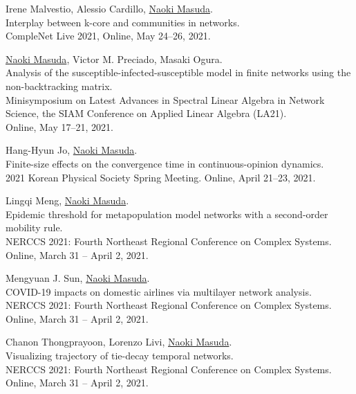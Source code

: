 \documentclass[11pt,letter]{article}
\begin{document}
\begin{etaremune}
\item Irene Malvestio, Alessio Cardillo, \underline{Naoki Masuda}.\\
Interplay between k-core and communities in networks.\\
CompleNet Live 2021, Online, May 24--26, 2021.\\

\item \underline{Naoki Masuda}, Victor M. Preciado, Masaki Ogura.\\
Analysis of the susceptible-infected-susceptible model in finite networks using the non-backtracking matrix.\\
Minisymposium on Latest Advances in Spectral Linear Algebra in Network Science, the SIAM Conference on Applied Linear Algebra (LA21).\\
Online, May 17--21, 2021.

\item Hang-Hyun Jo, \underline{Naoki Masuda}.\\
Finite-size effects on the convergence time in continuous-opinion dynamics.\\
2021 Korean Physical Society Spring Meeting.
Online, April 21--23, 2021.

\item Lingqi Meng, \underline{Naoki Masuda}.\\
Epidemic threshold for metapopulation model networks with a second-order mobility rule.\\
NERCCS 2021: Fourth Northeast Regional Conference on Complex Systems.\\
Online, March 31 -- April 2, 2021.

\item Mengyuan J. Sun, \underline{Naoki Masuda}.\\
COVID-19 impacts on domestic airlines via multilayer network analysis.\\
NERCCS 2021: Fourth Northeast Regional Conference on Complex Systems.\\
Online, March 31 -- April 2, 2021.

\item Chanon Thongprayoon, Lorenzo Livi, \underline{Naoki Masuda}.\\
Visualizing trajectory of tie-decay temporal networks.\\
NERCCS 2021: Fourth Northeast Regional Conference on Complex Systems.\\
Online, March 31 -- April 2, 2021.


\end{etaremune}
\end{document}
